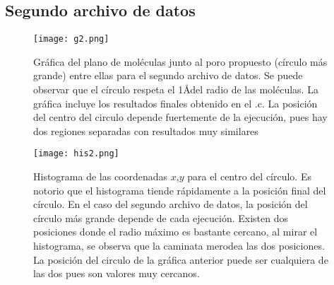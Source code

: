 \documentclass[notitlepage,letterpaper,12pt]{article} %
\begin{document}
\subsection{Segundo archivo de datos}


\begin{figure}[h!]
  \centering
   \texttt{[image: g2.png]}
  \caption{Gráfica del plano de moléculas junto al poro propuesto (círculo más grande) entre ellas para el segundo archivo de datos. Se puede observar que el círculo respeta el 1\AA  del radio de las moléculas. La gráfica incluye los resultados finales obtenido en el .c. La posición del centro del circulo depende fuertemente de la ejecución, pues hay dos regiones separadas con resultados muy similares}
  \label{g1d1}
\end{figure}
\newpage

\begin{figure}[h!]
  \centering
   \texttt{[image: his2.png]}
  \caption{Histograma de las coordenadas $x$,$y$ para el centro del círculo. Es notorio que el histograma tiende rápidamente a la posición final del círculo. En el caso del segundo archivo de datos, la posición del círculo más grande depende de cada ejecución. Existen dos posiciones donde el radio máximo es bastante cercano, al mirar el histograma, se observa que la caminata merodea las dos posiciones. La posición del circulo de la gráfica anterior puede ser cualquiera de las dos pues son valores muy cercanos. }
  \label{g2d1}
\end{figure}








\end{document}
